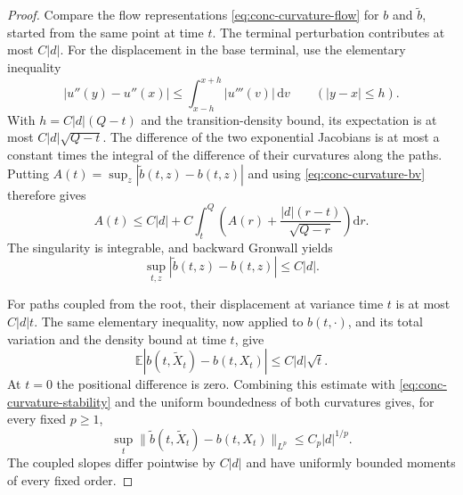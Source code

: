 \documentclass[11pt,a4paper]{article}
\numberwithin{equation}{section}
\theoremstyle{definition}
\theoremstyle{remark}
\newcommand{\E}{\mathbb E}
\newcommand{\dd}{\mathrm d}
\begin{document}
\begin{proof}
Compare the flow representations \eqref{eq:conc-curvature-flow} for
$b$ and $\widetilde b$, started from the same point at time $t$.
The terminal perturbation contributes at most $C|d|$.
For the displacement in the base terminal, use the elementary inequality
\[
 |u''(y)-u''(x)|\leq
       \int_{x-h}^{x+h}|u'''(v)|\,\dd v\qquad(|y-x|\leq h).
\]
With $h=C|d|(Q-t)$ and the transition-density bound, its expectation is
at most $C|d|\sqrt{Q-t}$.
The difference of the two exponential Jacobians is at most a constant
times the integral of the difference of their curvatures along the paths.
Putting $A(t)=\sup_z|\widetilde b(t,z)-b(t,z)|$ and using
\eqref{eq:conc-curvature-bv} therefore gives
\[
 A(t)\leq C|d|+C\int_t^Q
       \left(A(r)+\frac{|d|(r-t)}{\sqrt{Q-r}}\right)\dd r.
\]
The singularity is integrable, and backward Gronwall yields
\begin{equation}
 \sup_{t,z}|\widetilde b(t,z)-b(t,z)|\leq C|d|.
 \label{eq:conc-curvature-stability}
\end{equation}

For paths coupled from the root, their displacement at variance time $t$
is at most $C|d|t$.  The same elementary inequality, now applied to $b(t,\cdot)$,
and its total variation and the density bound at time $t$, give
\[
 \E|b(t,\widetilde X_t)-b(t,X_t)|\leq C|d|\sqrt t.
\]
At $t=0$ the positional difference is zero.  Combining this estimate with
\eqref{eq:conc-curvature-stability} and the uniform boundedness of both
curvatures gives, for every fixed $p\geq1$,
\begin{equation}
 \sup_t\|\widetilde b(t,\widetilde X_t)-b(t,X_t)\|_{L^p}
       \leq C_p|d|^{1/p}.
 \label{eq:conc-coupled-curvature}
\end{equation}
The coupled slopes differ pointwise by $C|d|$ and have uniformly bounded
moments of every fixed order.


\end{proof}
\end{document}
